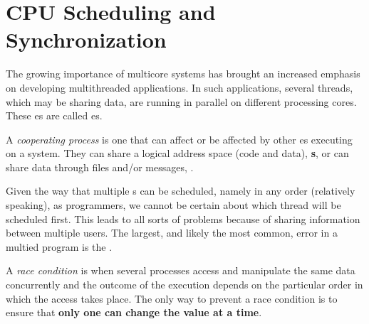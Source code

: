 \section{CPU Scheduling and Synchronization}\label{sec:CPU_Scheduling_Synchronization}
The growing importance of multicore systems has brought an increased emphasis on developing multithreaded applications.
In such applications, several threads, which may be sharing data, are running in parallel on different processing cores.
These es are called es.

\begin{definition}\label{def:Cooperating_Process}
  A \emph{cooperating process} is one that can affect or be affected by other es executing on a system.
  They can share a logical address space (code and data), \textbf{s}, or can share data through files and/or messages, \textbf{}.
\end{definition}

Given the way that multiple s can be scheduled, namely in any order (relatively speaking), as programmers, we cannot be certain about which thread will be scheduled first.
This leads to all sorts of problems because of sharing information between multiple users.
The largest, and likely the most common, error in a multied program is the .

\begin{definition}\label{def:Race_Condition}
  A \emph{race condition} is when several processes access and manipulate the same data concurrently and the outcome of the execution depends on the particular order in which the access takes place.
  The only way to prevent a race condition is to ensure that \textbf{only one  can change the value at a time}.
\end{definition}















